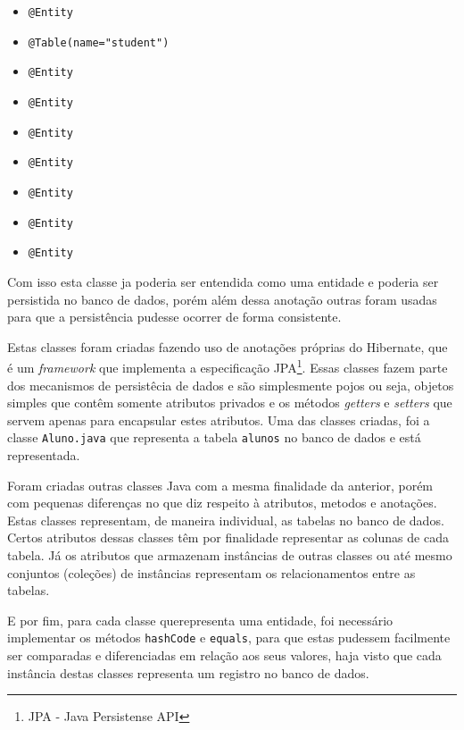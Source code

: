 	\begin{itemize}
	  \item \texttt{@Entity}
	  \item \texttt{@Table(name="student")} 
	  \item \texttt{@Entity}
	  \item \texttt{@Entity}
	  \item \texttt{@Entity}
	  \item \texttt{@Entity}
	  \item \texttt{@Entity}
	  \item \texttt{@Entity}
	  \item \texttt{@Entity}
\end{itemize}

	
	
	
	\par Com isso esta classe ja poderia ser entendida como uma entidade e
poderia ser persistida no banco de dados, porém além dessa anotação outras
foram usadas para que a persistência pudesse ocorrer de forma consistente.
	
 
	\par Estas classes foram criadas fazendo uso de anotações próprias do
Hibernate, que é um \textit{framework} que implementa a especificação
JPA\footnote{JPA - Java Persistense API}. Essas classes fazem parte dos
mecanismos de persistêcia de dados e são simplesmente pojos ou seja, objetos
simples que contêm somente atributos privados e os métodos \textit{getters} e
\textit{setters} que servem apenas para encapsular estes atributos. Uma das
classes criadas, foi a classe \texttt{Aluno.java} que representa a tabela
\texttt{alunos} no banco de dados e está representada.
	
	\par Foram criadas outras classes Java com a mesma finalidade da
anterior, porém com pequenas diferenças no que diz respeito à atributos,
metodos e anotações. Estas classes representam, de maneira individual, as
tabelas no banco de dados. Certos atributos dessas classes têm por finalidade
representar as colunas de cada tabela. Já os atributos que armazenam instâncias
de outras classes ou até mesmo conjuntos (coleções) de instâncias representam os
relacionamentos entre as tabelas. 

	\par E por fim, para cada classe querepresenta uma 	entidade, foi necessário
implementar os métodos \texttt{hashCode} e \texttt{equals}, para que estas
pudessem facilmente ser comparadas e diferenciadas em relação aos seus
valores, haja visto que cada instância destas classes representa um registro
no banco de dados.
	
